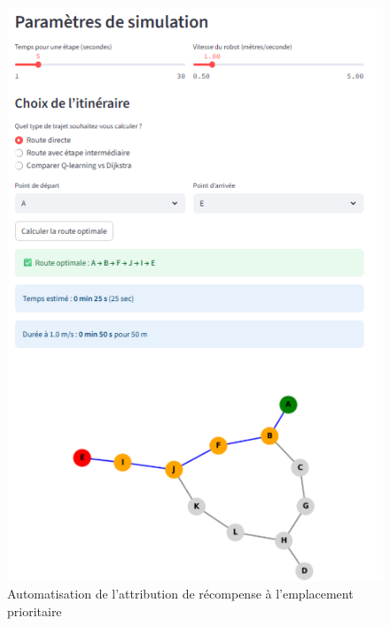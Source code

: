 \documentclass{article}
\begin{document}
\begin{figure}[htbp]
  \centering
  \begin{minipage}[b]{0.45\textwidth}
    \centering
    \includegraphics[width=\textwidth]{routedirect.png}
    \caption{Automatisation de l'attribution de récompense à l'emplacement prioritaire}
    \label{fig:Automatisation de l'attribution de récompense  à l'emplacement prioritaire}
  \end{minipage}
  \hfill
  \begin{minipage}[b]{0.45\textwidth}
    \centering

\end{minipage}
\end{figure}
\end{document}
